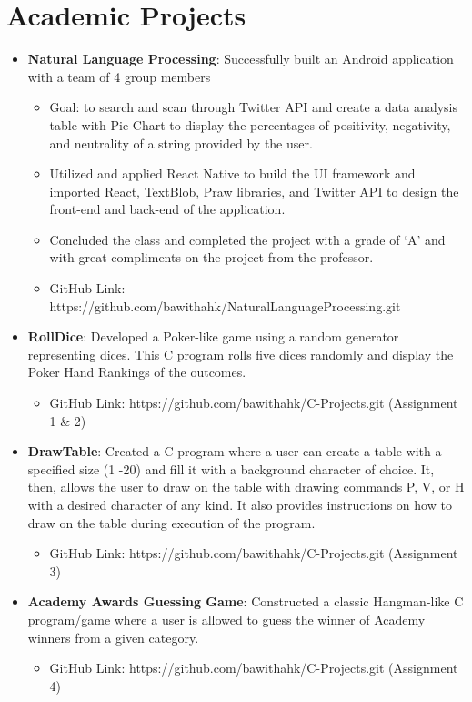\documentclass[letterpaper,11pt]{article}
\newcommand{\resumeItem}[2]{
  \item\small{
    \textbf{#1}{: #2 \vspace{-2pt}}
  }
}
\newcommand{\resumeSubItem}[2]{\resumeItem{#1}{#2}\vspace{-4pt}}
\newcommand{\resumeSubHeadingListStart}{\begin{itemize}[leftmargin=*]}
\newcommand{\resumeSubHeadingListEnd}{\end{itemize}}
\begin{document}
{\section{Academic Projects}
  \resumeSubHeadingListStart
    \resumeSubItem{Natural Language Processing}
      {Successfully built an Android application with a team of 4 group members}
    \begin{itemize}
        \item Goal: to search and scan through Twitter API and create a data analysis table with Pie Chart to display the percentages of positivity, negativity, and neutrality of a string provided by the user.
        \item Utilized and applied React Native to build the UI framework and imported React, TextBlob, Praw libraries, and Twitter API to design the front-end and back-end of the application.
        \item Concluded the class and completed the project with a grade of ‘A’ and with great compliments on the project from the professor.
        \item GitHub Link: https://github.com/bawithahk/NaturalLanguageProcessing.git
    \end{itemize}
    \resumeSubItem{RollDice}
      {Developed a Poker-like game using a random generator representing dices. This C program rolls five dices randomly and display the Poker Hand Rankings of the outcomes.}
    \begin{itemize}
        \item GitHub Link: https://github.com/bawithahk/C-Projects.git (Assignment 1 \& 2)
    \end{itemize}
    \resumeSubItem{DrawTable}
      {Created a C program where a user can create a table with a specified size (1 -20) and fill it with a background character of choice. It, then, allows the user to draw on the table with drawing commands P, V, or H with a desired character of any kind. It also provides instructions on how to draw on the table during execution of the program.}
    \begin{itemize}
        \item GitHub Link: https://github.com/bawithahk/C-Projects.git (Assignment 3)
    \end{itemize}
    \resumeSubItem{Academy Awards Guessing Game}
     {Constructed a classic Hangman-like C program/game where a user is allowed to guess the winner of Academy winners from a given category.}
    \begin{itemize}
        \item GitHub Link: https://github.com/bawithahk/C-Projects.git (Assignment 4)
    \end{itemize}
  \resumeSubHeadingListEnd

}
\end{document}
